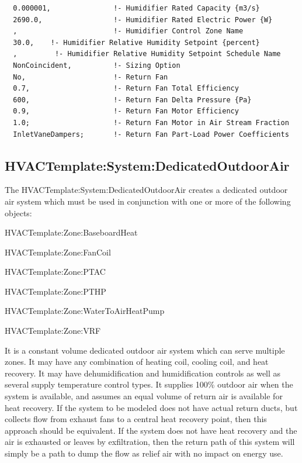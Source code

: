 \begin{lstlisting}
  0.000001,               !- Humidifier Rated Capacity {m3/s}
  2690.0,                 !- Humidifier Rated Electric Power {W}
  ,                       !- Humidifier Control Zone Name
  30.0,    !- Humidifier Relative Humidity Setpoint {percent}
  ,         !- Humidifier Relative Humidity Setpoint Schedule Name
  NonCoincident,          !- Sizing Option
  No,                     !- Return Fan
  0.7,                    !- Return Fan Total Efficiency
  600,                    !- Return Fan Delta Pressure {Pa}
  0.9,                    !- Return Fan Motor Efficiency
  1.0;                    !- Return Fan Motor in Air Stream Fraction
  InletVaneDampers;       !- Return Fan Part-Load Power Coefficients
\end{lstlisting}

\subsection{HVACTemplate:System:DedicatedOutdoorAir}\label{hvactemplatesystemdedicatedoutdoorair}

The HVACTemplate:System:DedicatedOutdoorAir creates a dedicated outdoor air system which must be used in conjunction with one or more of the following objects:

HVACTemplate:Zone:BaseboardHeat

HVACTemplate:Zone:FanCoil

HVACTemplate:Zone:PTAC

HVACTemplate:Zone:PTHP

HVACTemplate:Zone:WaterToAirHeatPump

HVACTemplate:Zone:VRF

It is a constant volume dedicated outdoor air system which can serve multiple zones. It may have any combination of heating coil, cooling coil, and heat recovery. It may have dehumidification and humidification controls as well as several supply temperature control types. It supplies 100\% outdoor air when the system is available, and assumes an equal volume of return air is available for heat recovery. If the system to be modeled does not have actual return ducts, but collects flow from exhaust fans to a central heat recovery point, then this approach should be equivalent. If the system does not have heat recovery and the air is exhausted or leaves by exfiltration, then the return path of this system will simply be a path to dump the flow as relief air with no impact on energy use.


